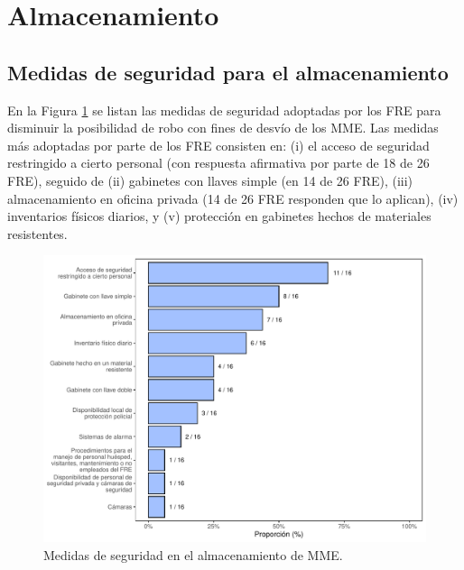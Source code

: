\documentclass[
  oneside]{book}
\begin{document}
\hypertarget{almacenamiento}{%
\section{Almacenamiento}\label{almacenamiento}}

\hypertarget{medidas-de-seguridad-para-el-almacenamiento}{%
\subsection{Medidas de seguridad para el almacenamiento}\label{medidas-de-seguridad-para-el-almacenamiento}}


En la Figura \ref{fig:MedidasSeguridadAlmacenamientoMME} se listan las medidas de seguridad adoptadas por los FRE para disminuir la posibilidad de robo con fines de desvío de los MME. Las medidas más adoptadas por parte de los FRE consisten en: (i) el acceso de seguridad restringido a cierto personal (con respuesta afirmativa por parte de 18 de 26 FRE), seguido de (ii) gabinetes con llaves simple (en 14 de 26 FRE), (iii) almacenamiento en oficina privada (14 de 26 FRE responden que lo aplican), (iv) inventarios físicos diarios, y (v) protección en gabinetes hechos de materiales resistentes.

\begin{figure}[!t]

{\centering \includegraphics[width=0.95\linewidth]{InformeFinal_files/figure-latex/MedidasSeguridadAlmacenamientoMME-1} 

}

\caption{Medidas de seguridad en el almacenamiento de MME.}\label{fig:MedidasSeguridadAlmacenamientoMME}
\end{figure}
\end{document}
